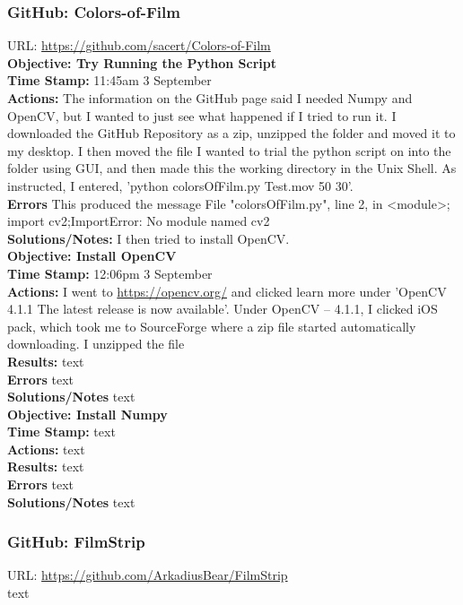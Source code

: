 \documentclass{article}
\begin{document}
\subsubsection{GitHub: Colors-of-Film}
URL: \url{https://github.com/sacert/Colors-of-Film}\\

\textbf{Objective: Try Running the Python Script}\\
\textbf{Time Stamp:} 11:45am 3 September\\
\textbf{Actions:} The information on the GitHub page said I needed Numpy and OpenCV, but I wanted to just see what happened if I tried to run it. I downloaded the GitHub Repository as a zip, unzipped the folder and moved it to my desktop. I then moved the file I wanted to trial the python script on into the folder using GUI, and then made this the working directory in the Unix Shell. As instructed, I entered, 'python colorsOfFilm.py Test.mov 50 30'.\\
\textbf{Errors} This produced the message File "colorsOfFilm.py", line 2, in <module>; import cv2;ImportError: No module named cv2\\
\textbf{Solutions/Notes:} I then tried to install OpenCV.\\

\textbf{Objective: Install OpenCV}\\
\textbf{Time Stamp:} 12:06pm 3 September\\
\textbf{Actions:} I went to \url{https://opencv.org/} and clicked learn more under 'OpenCV 4.1.1 The latest release is now available'. Under OpenCV – 4.1.1, I clicked iOS pack, which took me to SourceForge where a zip file started automatically downloading. I unzipped the file\\
\textbf{Results:} text\\
\textbf{Errors} text\\
\textbf{Solutions/Notes} text\\

\textbf{Objective: Install Numpy}\\
\textbf{Time Stamp:} text\\
\textbf{Actions:} text\\
\textbf{Results:} text\\
\textbf{Errors} text\\
\textbf{Solutions/Notes} text\\

\subsubsection{GitHub: FilmStrip}
URL: \url{https://github.com/ArkadiusBear/FilmStrip}\\
text
\end{document}
